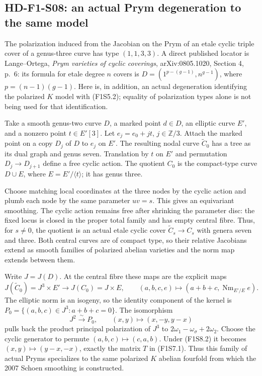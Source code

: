 \subsection{HD-F1-S08: an actual Prym degeneration to the same model}

The polarization induced from the Jacobian on the Prym of an
etale cyclic triple cover of a genus-three curve has type
$(1,1,3,3)$. A direct published locator is Lange--Ortega,
\emph{Prym varieties of cyclic coverings}, arXiv:0805.1020,
Section 4, p.~6: its formula for etale degree $n$ covers is
$D=(1^{p-(g-1)},n^{g-1})$, where $p=(n-1)(g-1)$.
Here is, in addition, an actual degeneration identifying the
polarized $K$ model with (F1S5.2); equality of polarization
types alone is not being used for that identification.

Take a smooth genus-two curve $D$, a marked point $d\in D$,
an elliptic curve $E'$, and a nonzero point $t\in E'[3]$.
Let $e_j=e_0+jt$, $j\in\mathbb Z/3$. Attach the marked point
on a copy $D_j$ of $D$ to $e_j$ on $E'$. The resulting nodal
curve $\widetilde C_0$ has a tree as its dual graph and genus
seven. Translation by $t$ on $E'$ and permutation
$D_j\to D_{j+1}$ define a free cyclic action. The quotient
$C_0$ is the compact-type curve $D\cup E$, where
$E=E'/\langle t\rangle$; it has genus three.

Choose matching local coordinates at the three nodes by the
cyclic action and plumb each node by the same parameter
$uv=s$. This gives an equivariant smoothing. The cyclic
action remains free after shrinking the parameter disc:
the fixed locus is closed in the proper total family and
has empty central fibre. Thus, for $s\ne0$, the quotient
is an actual etale cyclic cover
$\widetilde C_s\to C_s$ with genera seven and three.
Both central curves are of compact type, so their relative
Jacobians extend as smooth families of polarized abelian varieties and the norm map
extends between them.

Write $J=J(D)$. At the central fibre these maps are the
explicit maps
\[
 J(\widetilde C_0)=J^3\times E'
   \longrightarrow J(C_0)=J\times E,
 \qquad (a,b,c,e)\longmapsto
              (a+b+c,\operatorname{Nm}_{E'/E}e).
 \tag{F1S8.1}
\]
The elliptic norm is an isogeny, so the identity component
of the kernel is
$P_0=\{(a,b,c)\in J^3:a+b+c=0\}$.
The isomorphism
\[
 J^2\xrightarrow{\sim}P_0,\qquad
 (x,y)\longmapsto(x,-y,y-x)
 \tag{F1S8.2}
\]
pulls back the product principal polarization of $J^3$ to
$2\omega_1-\omega_\sigma+2\omega_2$.
Choose the cyclic generator to permute
$(a,b,c)\mapsto(c,a,b)$. Under (F1S8.2) it becomes
$(x,y)\mapsto(y-x,-x)$, exactly the matrix $T$ in
(F1S7.1). Thus this family of actual Pryms specializes to
the same polarized $K$ abelian fourfold from which the
2007 Schoen smoothing is constructed.

